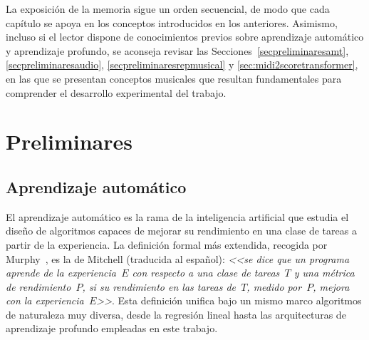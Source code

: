 \documentclass[11pt,spanish,listoffigures,listoftables]{tfgetsinf}
\begin{document}
La exposición de la memoria sigue un orden secuencial, de modo que cada capítulo
se apoya en los conceptos introducidos en los anteriores. Asimismo, incluso si el lector
dispone de conocimientos previos sobre aprendizaje automático y aprendizaje
profundo, se aconseja revisar las Secciones~\ref{secpreliminaresamt}, \ref{secpreliminaresaudio}, \ref{secpreliminaresrepmusical} y \ref{sec:midi2scoretransformer}, en las que se
presentan conceptos musicales que resultan fundamentales para comprender el desarrollo experimental
del trabajo.







\chapter{Preliminares}
\label{chap:preliminares}

\section{Aprendizaje automático}
\label{secpreliminaresml}

El aprendizaje automático es la rama de la inteligencia artificial que estudia
el diseño de algoritmos capaces de mejorar su rendimiento en una clase de tareas
a partir de la experiencia. La definición formal más extendida, recogida por
Murphy~\cite{murphy2022pml}, es la de Mitchell (traducida al español): \textit{<<se dice que un programa
aprende de la experiencia~$E$ con respecto a una clase de tareas~$T$ y una métrica
de rendimiento~$P$, si su rendimiento en las tareas de~$T$, medido por~$P$, mejora
con la experiencia~$E$>>}. Esta definición unifica bajo un mismo marco algoritmos
de naturaleza muy diversa, desde la regresión lineal hasta las arquitecturas de
aprendizaje profundo empleadas en este trabajo.
\end{document}
